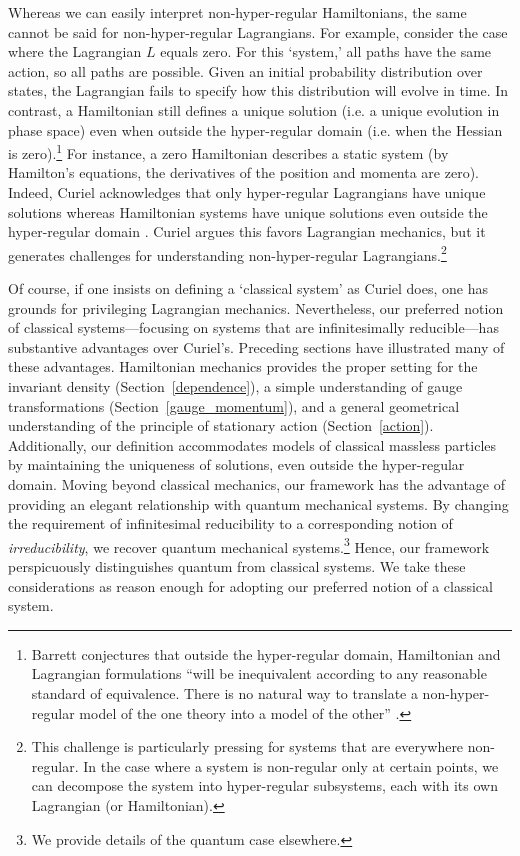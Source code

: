 \documentclass[12pt, english, twoside]{article} %
\begin{document}
Whereas we can easily interpret non-hyper-regular Hamiltonians, the same cannot be said for non-hyper-regular Lagrangians. For example, consider the case where the Lagrangian $L$ equals zero. For this `system,' all paths have the same action, so all paths are possible. Given an initial probability distribution over states, the Lagrangian fails to specify how this distribution will evolve in time. In contrast, a Hamiltonian still defines a unique solution (i.e. a unique evolution in phase space) even when outside the hyper-regular domain (i.e. when the Hessian is zero).\footnote{Barrett conjectures that outside the hyper-regular domain, Hamiltonian and Lagrangian formulations ``will be inequivalent according to any reasonable standard of equivalence. There is no natural way to translate a non-hyper-regular model of the one theory into a model of the other'' \parencites*[1179]{Barrett2}.} For instance, a zero Hamiltonian describes a static system (by Hamilton's equations, the derivatives of the position and momenta are zero). Indeed, Curiel acknowledges that only hyper-regular Lagrangians have unique solutions whereas Hamiltonian systems have unique solutions even outside the hyper-regular domain \parencites*[291, 308]{Curiel}. Curiel argues this favors Lagrangian mechanics, but it generates challenges for understanding non-hyper-regular Lagrangians.\footnote{This challenge is particularly pressing for systems that are everywhere non-regular. In the case where a system is non-regular only at certain points, we can decompose the system into hyper-regular subsystems, each with its own Lagrangian (or Hamiltonian).}

Of course, if one insists on defining a `classical system' as Curiel does, one has grounds for privileging Lagrangian mechanics. Nevertheless, our preferred notion of classical systems---focusing on systems that are infinitesimally reducible---has substantive advantages over Curiel's. Preceding sections have illustrated many of these advantages. Hamiltonian mechanics provides the proper setting for the invariant density (Section~\ref{dependence}), a simple understanding of gauge transformations (Section~\ref{gauge_momentum}), and a general geometrical understanding of the principle of stationary action (Section~\ref{action}). Additionally, our definition accommodates models of classical massless particles by maintaining the uniqueness of solutions, even outside the hyper-regular domain. Moving beyond classical mechanics, our framework has the advantage of providing an elegant relationship with quantum mechanical systems. By changing the requirement of infinitesimal reducibility to a corresponding notion of \textit{irreducibility}, we recover quantum mechanical systems.\footnote{We provide details of the quantum case elsewhere.} Hence, our framework perspicuously distinguishes quantum from classical systems. We take these considerations as reason enough for adopting our preferred notion of a classical system. 
\end{document}
